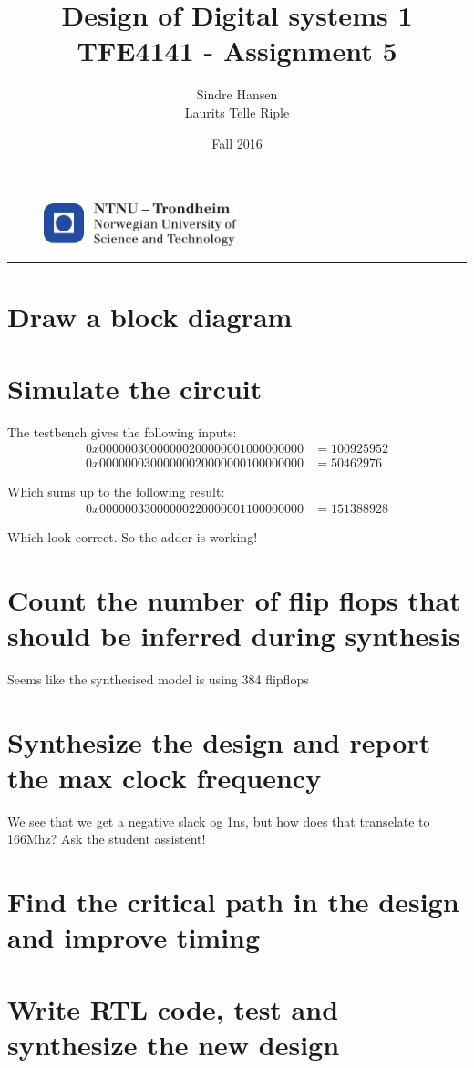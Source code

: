 \documentclass{article}
\title{Design of Digital systems 1 TFE4141 - Assignment 5}
\author{Sindre Hansen \\ Laurits Telle Riple}
\date{Fall 2016}
\begin{document}
\begin{figure}
  \centering
  \includegraphics[width=0.5\textwidth]{images/logontnu_eng}
\end{figure}
\maketitle
\rule{\linewidth}{0.5mm}

\section{Draw a block diagram}
\section{Simulate the circuit}
The testbench gives the following inputs:
\begin{align*}
  0x00000030000000200000001000000000 &= 100925952 \\
  0x00000003000000020000000100000000 &= 50462976
\end{align*}

Which sums up to the following result:
\begin{align*}
  0x00000033000000220000001100000000 &= 151388928
\end{align*}

Which look correct. So the adder is working!
\section{Count the number of flip flops that should be inferred during synthesis}
Seems like the synthesised model is using 384 flipflops
\section{Synthesize the design and report the max clock frequency}
We see that we get a negative slack og 1ns, but how does that
transelate to 166Mhz? Ask the student assistent!

\section{Find the critical path in the design and improve timing}

\section{Write RTL code, test and synthesize the new design}
\end{document}
